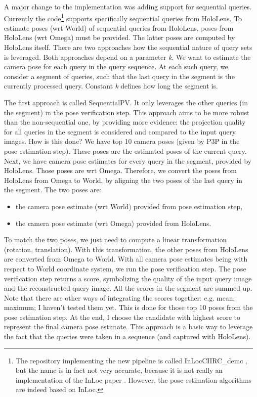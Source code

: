 \documentclass[twoside]{ctuthesis}
\theoremstyle{plain}
\theoremstyle{definition}
\theoremstyle{note}
\newcommand{\code}[1]{{\ttfamily #1%
}}
\newcommand{\topPE}{10} %
\begin{document}
A major change to the implementation was adding support for sequential queries. Currently the code\footnote{The repository implementing the new pipeline is called \code{InLocCIIRC\_demo}, but the name is in fact not very accurate, because it is not really an implementation of the InLoc paper \cite{taira2018inloc}. However, the pose estimation algorithms are indeed based on InLoc.} supports specifically sequential queries from HoloLens. To estimate poses (wrt World) of sequential queries from HoloLens, poses from HoloLens (wrt Omega) must be provided. The latter poses are computed by HoloLens itself. There are two approaches how the sequential nature of query sets is leveraged. Both approaches depend on a parameter \emph{k}. We want to estimate the camera pose for each query in the query sequence. At each such query, we consider a segment of queries, such that the last query in the segment is the currently processed query. Constant \emph{k} defines how long the segment is.

The first approach is called SequentialPV. It only leverages the other queries (in the segment) in the pose verification step. This approach aims to be more robust than the non-sequential one, by providing more evidence: the projection quality for all queries in the segment is considered and compared to the input query images. How is this done? We have top \topPE{} camera poses (given by P3P in the pose estimation step). These poses are the estimated poses of the current query. Next, we have camera pose estimates for every query in the segment, provided by HoloLens. Those poses are wrt Omega. Therefore, we convert the poses from HoloLens from Omega to World, by aligning the two poses of the last query in the segment. The two poses are:

\begin{itemize}
	\item the camera pose estimate (wrt World) provided from pose estimation step,
	\item the camera pose estimate (wrt Omega) provided from HoloLens.
\end{itemize}

To match the two poses, we just need to compute a linear transformation (rotation, translation). With this transformation, the other poses from HoloLens are converted from Omega to World. With all camera pose estimates being with respect to World coordinate system, we run the pose verification step. The pose verification step returns a score, symbolizing the quality of the input query image and the reconstructed query image. All the scores in the segment are summed up. Note that there are other ways of integrating the scores together: e.g. mean, maximum; I haven't tested them yet. This is done for those top \topPE{} poses from the pose estimation step. At the end, I choose the candidate with highest score to represent the final camera pose estimate. This approach is a basic way to leverage the fact that the queries were taken in a sequence (and captured with HoloLens).
\end{document}
